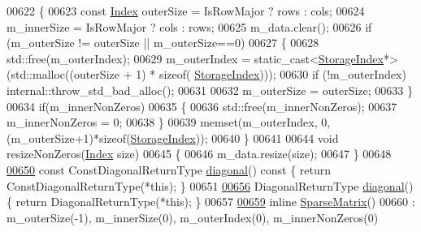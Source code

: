 \begin{DoxyCode}
00622     \{
00623       \textcolor{keyword}{const} \hyperlink{group___core___module_a554f30542cc2316add4b1ea0a492ff02}{Index} outerSize = IsRowMajor ? rows : cols;
00624       m\_innerSize = IsRowMajor ? cols : rows;
00625       m\_data.clear();
00626       \textcolor{keywordflow}{if} (m\_outerSize != outerSize || m\_outerSize==0)
00627       \{
00628         std::free(m\_outerIndex);
00629         m\_outerIndex = \textcolor{keyword}{static\_cast<}\hyperlink{group___sparse_core___module_a0b540ba724726ebe953f8c0df06081ed}{StorageIndex}*\textcolor{keyword}{>}(std::malloc((outerSize + 1) * \textcolor{keyword}{sizeof}(
      \hyperlink{group___sparse_core___module_a0b540ba724726ebe953f8c0df06081ed}{StorageIndex})));
00630         \textcolor{keywordflow}{if} (!m\_outerIndex) internal::throw\_std\_bad\_alloc();
00631         
00632         m\_outerSize = outerSize;
00633       \}
00634       \textcolor{keywordflow}{if}(m\_innerNonZeros)
00635       \{
00636         std::free(m\_innerNonZeros);
00637         m\_innerNonZeros = 0;
00638       \}
00639       memset(m\_outerIndex, 0, (m\_outerSize+1)*\textcolor{keyword}{sizeof}(\hyperlink{group___sparse_core___module_a0b540ba724726ebe953f8c0df06081ed}{StorageIndex}));
00640     \}
00641 
00644     \textcolor{keywordtype}{void} resizeNonZeros(\hyperlink{group___core___module_a554f30542cc2316add4b1ea0a492ff02}{Index} size)
00645     \{
00646       m\_data.resize(size);
00647     \}
00648 
\hyperlink{group___sparse_core___module_a4423486f9fd64cbac7be06c748b37e0a}{00650}     \textcolor{keyword}{const} ConstDiagonalReturnType \hyperlink{group___sparse_core___module_a4423486f9fd64cbac7be06c748b37e0a}{diagonal}()\textcolor{keyword}{ const }\{ \textcolor{keywordflow}{return} ConstDiagonalReturnType(*\textcolor{keyword}{this}); \}
00651     
\hyperlink{group___sparse_core___module_af83005640c2771ebd69f98848720ee52}{00656}     DiagonalReturnType \hyperlink{group___sparse_core___module_af83005640c2771ebd69f98848720ee52}{diagonal}() \{ \textcolor{keywordflow}{return} DiagonalReturnType(*\textcolor{keyword}{this}); \}
00657 
\hyperlink{group___sparse_core___module_a68087ee333c9614ea28850ec52069079}{00659}     \textcolor{keyword}{inline} \hyperlink{group___sparse_core___module_a68087ee333c9614ea28850ec52069079}{SparseMatrix}()
00660       : m\_outerSize(-1), m\_innerSize(0), m\_outerIndex(0), m\_innerNonZeros(0)

\end{DoxyCode}

